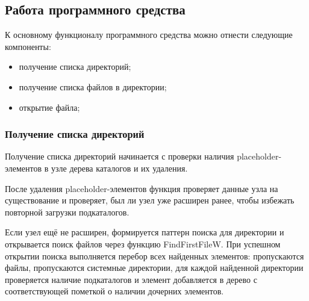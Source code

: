 \subsection{Работа программного средства}

К основному функционалу программного средства можно отнести
следующие компоненты:

\begin{itemize}
    \item получение списка директорий;
    \item получение списка файлов в директории;
    \item открытие файла;
\end{itemize}

\subsubsection{Получение списка директорий}

Получение списка директорий начинается с проверки наличия
placeholder-элементов в узле дерева
каталогов и их удаления.

После удаления placeholder-элементов функция проверяет
данные узла на существование и проверяет, был ли узел
уже расширен ранее, чтобы избежать повторной загрузки
подкаталогов.

Если узел ещё не расширен, формируется паттерн поиска
для директории и открывается поиск файлов через функцию
FindFirstFileW. При успешном открытии поиска выполняется
перебор всех найденных элементов: пропускаются файлы,
пропускаются системные директории, для каждой найденной
директории проверяется наличие подкаталогов и элемент
добавляется в дерево с соответствующей пометкой о наличии
дочерних элементов.

